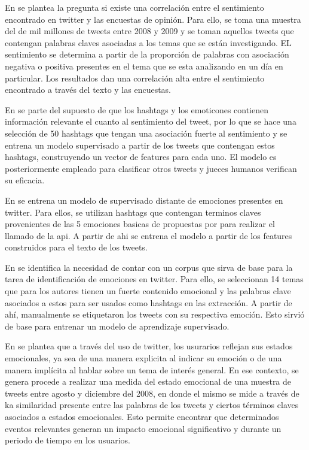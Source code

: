 En \cite{o2010tweets} se plantea la pregunta si existe una correlación entre el sentimiento encontrado en twitter y las encuestas de opinión. Para ello, se toma una muestra del de mil millones de tweets entre 2008 y 2009 y se toman aquellos tweets que contengan palabras claves asociadas a los temas que se están investigando. EL sentimiento se determina a partir de la proporción de palabras con asociación negativa o positiva presentes en el tema que se esta analizando en un día en particular. Los resultados dan una correlación alta entre el sentimiento encontrado a través del texto y las encuestas.

En \cite{davidov2010enhanced} se parte del supuesto de que los hashtags y los emoticones contienen información relevante el cuanto al sentimiento del tweet, por lo que se hace una selección de 50 hashtags que tengan una asociación fuerte al sentimiento y se entrena un modelo supervisado a partir de los tweets que contengan estos hashtags, construyendo un vector de features para cada uno. El modelo es posteriormente empleado para clasificar otros tweets y jueces humanos verifican su eficacia.


En  \cite{wang2012harnessing} se entrena un modelo de supervisado distante de emociones presentes en twitter. Para ellos, se utilizan hashtags que contengan terminos claves provenientes de las 5 emociones basicas de propuestas por \cite{ekman1993facial} para realizar el llamado de la api. A partir de ahi se entrena el modelo a partir de los features construidos para el texto de los tweets. 

En \cite{roberts2012empatweet} se identifica la necesidad de contar con un corpus que sirva de base para la tarea de identificación de emociones en twitter. Para ello, se seleccionan  14 temas que para los autores tienen un fuerte contenido emocional y las palabras clave asociados a estos para ser usados como hashtags en las extracción. A partir de ahí, manualmente se etiquetaron los tweets con su respectiva emoción. Esto sirvió de base para entrenar un modelo de aprendizaje supervisado.



En \cite{bollen2011modeling} se plantea que a través del uso de twitter, los usurarios reflejan sus estados emocionales, ya sea de una manera explicita al indicar su emoción o de una manera implícita al hablar sobre un tema de interés general. En ese contexto, se genera procede a realizar una medida del estado emocional de una muestra de tweets entre agosto y diciembre del 2008, en donde el mismo se mide a través de ka similaridad presente entre las palabras de los tweets y ciertos términos claves asociados a estados emocionales. Esto permite encontrar que determinados eventos relevantes generan un impacto emocional significativo y durante un periodo de tiempo en los usuarios.

